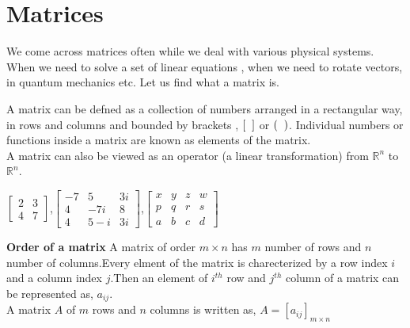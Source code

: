 \chapter{Matrices}
We  come  across  matrices often while  we  deal  with various physical systems. When we need to solve  a  set  of  linear  equations  ,  when  we  need  to  rotate  vectors, in quantum mechanics etc. Let us find what a matrix is.
\begin{definition}
A matrix can be defned as a collection of numbers arranged in a rectangular way, in rows and columns and bounded by brackets , $[\hspace{0.2cm} ]$  or  $(\hspace{0.2cm})$. Individual numbers or functions inside a matrix  are known as elements of the matrix.\\ A matrix can also be viewed as an operator (a linear transformation) from $\mathbb{R}^{n}$ to $\mathbb{R}^{n}$.	
\end{definition}
\begin{example}
$\left[\begin{array}{ll}2 & 3 \\ 4 & 7\end{array}\right]$,$\left[\begin{array}{lll}-7 & 5 &3i\\ 4 & -7i&8\\4 & 5-i &3i \end{array}\right]$,$\left[\begin{array}{llll}x & y &z&w\\ p & q&r&s\\a & b &c&d \end{array}\right]$		
\end{example}
\textbf{Order of a matrix}
\newline A matrix of order $m\times n$ has $m$ number of rows and  $n$  number of columns.Every elment of the matrix is charecterized by a row index $i$ and a column index $j$.Then an element of $i^{th}$ row and $j^{th}$ column of a matrix can be represented as, $a_{ij}$.
\\A matrix $A$ of $m$ rows and $n$ columns is written as,
$A=[a_{ij}]_{m\times n}$

